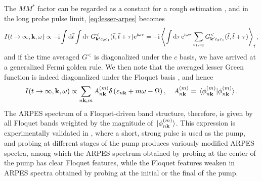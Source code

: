 \documentclass[hyperref, a4paper]{article}
\newcommand*{\ii}{\mathrm{i}}
\newcommand*{\ee}{\mathrm{e}}
\begin{document}
The $MM^*$ factor can be regarded as a constant for a rough estimation 
\cite{freericks2009theoretical,chan2023giant},
and in the long probe pulse limit, \eqref{eq:lesser-arpes} becomes 
\begin{equation}
    I(t \to \infty, \vb{k}, \omega) \propto
    - \ii \int \dd{\bar{t}} \int \dd{\tau} G^<_{\vb{k}' c_2 c_1}(\bar{t}, \bar{t} + \tau) \ee^{\ii \omega \tau} 
    = - \ii \expval{\int \dd{\tau} \ee^{\ii \omega \tau}
    \sum_{c_1, c_2} G^<_{\vb{k}' c_2 c_1}(\bar{t}, \bar{t} + \tau)}_{\bar{t}},
\end{equation} 
and if the time averaged $G^<$ is diagonalized under the $c$ basis, 
we have arrived at a generalized Fermi golden rule.
We then note that the averaged lesser Green function is indeed diagonalized under the Floquet basis \cite{rudner2020floquet}, and hence 
\begin{equation}
    I(t \to \infty, \vb{k}, \omega) \propto \sum_{n \vb{k}, m} A_{n \vb{k}}^{(m)} \delta\left(\varepsilon_{n \vb{k}} +m \omega-\Omega\right), 
    \quad A_{n \vb{k}}^{(m)}= \braket*{\phi_{n \vb{k}}^{(m)}}{\phi_{n \vb{k}}^{(m)}}.
\end{equation}
The ARPES spectrum of a Floquet-driven band structure, therefore, 
is given by all Floquet bands weighted by the magnitude of $\ket*{\phi_{n \vb{k}}^{(m)}}$.
This expression is experimentally validated in \cite{mahmood2016selective},
where a short, strong pulse is used as the pump, 
and probing at different stages of the pump 
produces variously modified ARPES spectra, 
among which the ARPES spectrum obtained by probing at the center of the pump 
has clear Floquet features, 
while the Floquet features weaken in ARPES spectra 
obtained by probing at the initial or the final of the pump.
\end{document}
